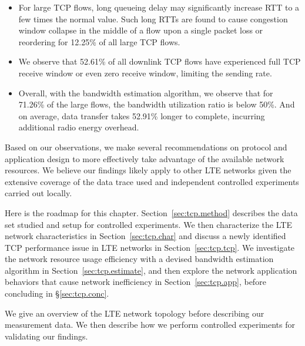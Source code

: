 \begin{itemize}
\item For large TCP flows, long queueing delay may significantly increase RTT to a few times the normal value. Such long RTTs are found to cause congestion window collapse in the middle of a flow upon a single packet loss or reordering for 12.25\% of all large TCP flows.
\item We observe that 52.61\% of all downlink TCP flows have experienced full TCP receive window or even zero receive window, limiting the sending rate.
\item Overall, with the bandwidth estimation algorithm, we observe
that for 71.26\% of the large flows, the bandwidth utilization ratio
is below 50\%. And on average, data transfer takes 52.91\% longer to
complete, incurring additional radio energy overhead.
\end{itemize}

Based on our observations, we make several recommendations on protocol and application design to more effectively take
advantage of the available network resources. We believe our findings likely apply to other LTE networks given the extensive coverage of the data trace used and independent controlled experiments carried out locally.

Here is the roadmap for this chapter. Section~\ref{sec:tcp.method} describes the data set studied and setup for controlled experiments. We then characterize the LTE network characteristics in Section~\ref{sec:tcp.char} and discuss a newly identified TCP performance issue in LTE networks in Section~\ref{sec:tcp.tcp}. We investigate the network resource usage efficiency with a devised bandwidth estimation algorithm in Section~\ref{sec:tcp.estimate}, and then explore the network application behaviors that cause network inefficiency in Section~\ref{sec:tcp.app}, before concluding in \S\ref{sec:tcp.conc}.


\label{sec:tcp.method}

We give an overview of the LTE network topology before describing our measurement data. We then describe how we perform controlled experiments for validating our findings.

\label{sec:tcp.data}


\begin{figure}[t]
\centering
{}\\
\label{fig:tcp.architecture}
\end{figure}


